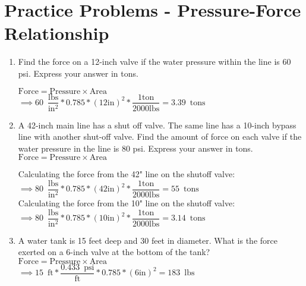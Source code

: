 \section*{Practice Problems - Pressure-Force Relationship}
\begin{enumerate}
  \item Find the force on a 12-inch valve if the water pressure within the line is 60 psi. Express your answer in tons.

$\textrm{Force}= \textrm{Pressure} \times \textrm{Area}$\\
\vspace{0.3cm}
$\implies 60 \enspace \dfrac{\mathrm{lbs}}{\mathrm{in^2}}*0.785 *(12 \mathrm{in})^2*\dfrac{1 \mathrm{ton}}{2000 \mathrm{lbs}} =\boxed{3.39 \enspace\mathrm{tons}}$
\vspace{0.3cm}
  \item A 42-inch main line has a shut off valve. The same line has a 10-inch bypass line with another shut-off valve. Find the amount of force on each valve if the water pressure in the line is 80 psi. Express your answer in tons.\\

\vspace{0.5cm}
$\textrm{Force}= \textrm{Pressure} \times \textrm{Area}$\\
\vspace{0.5cm}

\vspace{0.5cm}
Calculating the force from the 42" line on the shutoff valve:\\

\vspace{0.3cm}
$\implies 80 \enspace \dfrac{\mathrm{lbs}}{\mathrm{in^2}}*0.785 *(42 \mathrm{in})^2*\dfrac{1 \mathrm{ton}}{2000 \mathrm{lbs}} =\boxed{55 \enspace\mathrm{tons}}$\\

\vspace{0.3cm}
Calculating the force from the 10" line on the shutoff valve:\\

\vspace{0.3cm}
$\implies 80 \enspace \dfrac{\mathrm{lbs}}{\mathrm{in^2}}*0.785 *(10 \mathrm{in})^2*\dfrac{1 \mathrm{ton}}{2000 \mathrm{lbs}} =\boxed{3.14 \enspace\mathrm{tons}}$\\

  \item A water tank is 15 feet deep and 30 feet in diameter. What is the force exerted on a 6-inch valve at the bottom of the tank?\\
\vspace{0.5cm}
$\textrm{Force}= \textrm{Pressure} \times \textrm{Area}$\\
\vspace{0.5cm}
$\implies 15 \enspace\mathrm{ft}* \dfrac{0.433 \enspace \mathrm{psi}}{\mathrm{ft}}*0.785 *(6 \mathrm{in})^2 =\boxed{183 \enspace\mathrm{lbs}}$\\
\vspace{0.3cm}
\end{enumerate}
\vspace{1cm}

